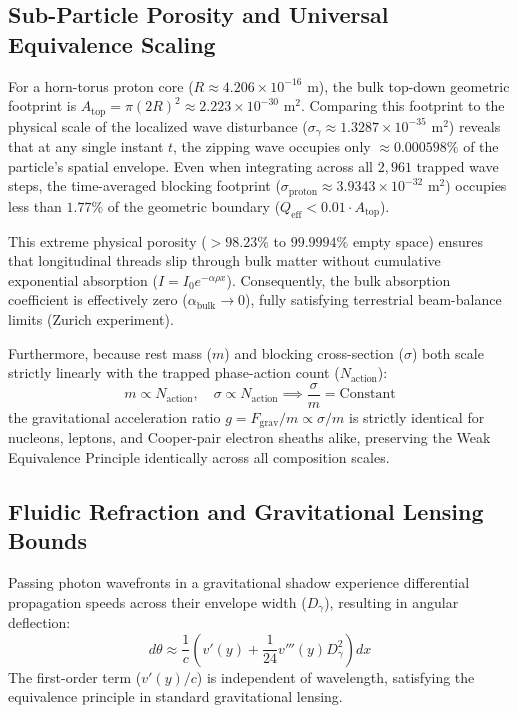 \documentclass[11pt,a4paper]{article}
\begin{document}
	\subsection{Sub-Particle Porosity and Universal Equivalence Scaling}
	For a horn-torus proton core ($R \approx 4.206 \times 10^{-16}\text{ m}$), the bulk top-down geometric footprint is $A_{\text{top}} = \pi (2R)^2 \approx 2.223 \times 10^{-30}\text{ m}^2$. Comparing this footprint to the physical scale of the localized wave disturbance ($\sigma_\gamma \approx 1.3287 \times 10^{-35}\text{ m}^2$) reveals that at any single instant $t$, the zipping wave occupies only $\approx 0.000598\%$ of the particle's spatial envelope. Even when integrating across all $2,961$ trapped wave steps, the time-averaged blocking footprint ($\sigma_{\text{proton}} \approx 3.9343 \times 10^{-32}\text{ m}^2$) occupies less than $1.77\%$ of the geometric boundary ($Q_{\text{eff}} < 0.01 \cdot A_{\text{top}}$).
	
	This extreme physical porosity ($>98.23\%$ to $99.9994\%$ empty space) ensures that longitudinal threads slip through bulk matter without cumulative exponential absorption ($I = I_0 e^{-\alpha \rho x}$). Consequently, the bulk absorption coefficient is effectively zero ($\alpha_{\text{bulk}} \to 0$), fully satisfying terrestrial beam-balance limits (Zurich experiment).
	
	Furthermore, because rest mass ($m$) and blocking cross-section ($\sigma$) both scale strictly linearly with the trapped phase-action count ($N_{\text{action}}$):
	\begin{equation}
		m \propto N_{\text{action}}, \quad \sigma \propto N_{\text{action}} \implies \frac{\sigma}{m} = \text{Constant}
	\end{equation}
	the gravitational acceleration ratio $g = F_{\text{grav}}/m \propto \sigma/m$ is strictly identical for nucleons, leptons, and Cooper-pair electron sheaths alike, preserving the Weak Equivalence Principle identically across all composition scales.
	
	\subsection{Fluidic Refraction and Gravitational Lensing Bounds}
	Passing photon wavefronts in a gravitational shadow experience differential propagation speeds across their envelope width ($D_\gamma$), resulting in angular deflection:
	\begin{equation}
		d\theta \approx \frac{1}{c}\left( v'(y) + \frac{1}{24}v'''(y)D_{\gamma}^2 \right) dx
	\end{equation}
	The first-order term ($v'(y)/c$) is independent of wavelength, satisfying the equivalence principle in standard gravitational lensing.
	
\end{document}

